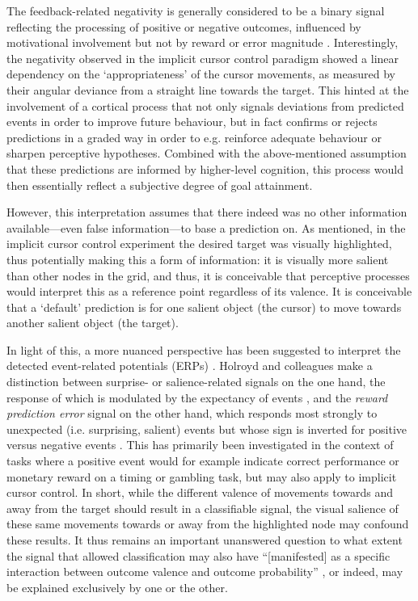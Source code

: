 The feedback-related negativity is generally considered to be a binary signal reflecting the processing of positive or negative outcomes, influenced by motivational involvement but not by reward or error magnitude \cite{yeung2004passiveactivefrn,hajcak2006binaryfrn}. Interestingly, the negativity observed in the implicit cursor control paradigm showed a linear dependency on the `appropriateness' of the cursor movements, as measured by their angular deviance from a straight line towards the target. This hinted at the involvement of a cortical process that not only signals deviations from predicted events in order to improve future behaviour, but in fact confirms or rejects predictions in a graded way in order to e.g. reinforce adequate behaviour or sharpen perceptive hypotheses. Combined with the above-mentioned assumption that these predictions are informed by higher-level cognition, this process would then essentially reflect a subjective degree of goal attainment.

However, this interpretation assumes that there indeed was no other information available---even false information---to base a prediction on. As mentioned, in the implicit cursor control experiment the desired target was visually highlighted, thus potentially making this a form of information: it is visually more salient than other nodes in the grid, and thus, it is conceivable that perceptive processes would interpret this as a reference point regardless of its valence. It is conceivable that a `default' prediction is for one salient object (the cursor) to move towards another salient object (the target).

In light of this, a more nuanced perspective has been suggested to interpret the detected event-related potentials (ERPs) \cite{cockburn2018rewardpositivity}. Holroyd and colleagues make a distinction between surprise- or salience-related signals on the one hand, the response of which is modulated by the expectancy of events \cite{holroyd2002}, and the \emph{reward prediction error} signal on the other hand, which responds most strongly to unexpected (i.e. surprising, salient) events but whose sign is inverted for positive versus negative events \cite{sambrook2015rewardprediction}. This has primarily been investigated in the context of tasks where a positive event would for example indicate correct performance or monetary reward on a timing or gambling task, but may also apply to implicit cursor control. In short, while the different valence of movements towards and away from the target should result in a classifiable signal, the visual salience of these same movements towards or away from the highlighted node may confound these results. It thus remains an important unanswered question to what extent the signal that allowed classification may also have ``[manifested] as a specific interaction between outcome valence and outcome probability'' \cite{heydari2016rewardorsalience}, or indeed, may be explained exclusively by one or the other.

